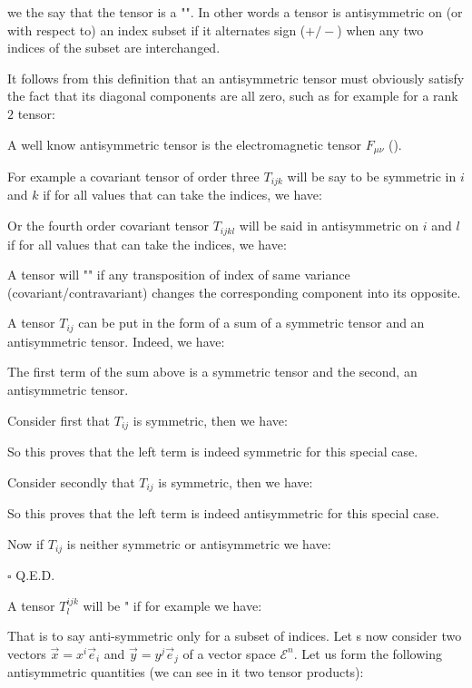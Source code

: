 	we the say that the tensor is a "".  In other words a tensor is antisymmetric on (or with respect to) an index subset if it alternates sign ($+/-$) when any two indices of the subset are interchanged.
	
	It follows from this definition that an antisymmetric tensor must obviously satisfy the fact that its diagonal components are all zero, such as for example for a rank $2$ tensor:
	
	
	A well know antisymmetric tensor is the electromagnetic tensor $F_{\mu \nu }$ ().
	
	For example a covariant tensor of order three $T_{ijk}$ will be say to be symmetric in $i$ and $k$ if for all values that can take the indices, we have:
	
	Or the fourth order covariant tensor $T_{ijkl}$ will be said in antisymmetric on $i$ and $l$ if for all values that can take the indices, we have:
	 
	
	A tensor will "" if any transposition of index of same variance (covariant/contravariant) changes the corresponding component into its opposite.

	A tensor $T_{ij}$ can be put in the form of a sum of a symmetric tensor and an antisymmetric tensor. Indeed, we have:
	
	The first term of the sum above is a symmetric tensor and the second, an antisymmetric tensor.
	\begin{dem}
	Consider first that $T_{ij}$ is symmetric, then we have:
	
	So this proves that the left term is indeed symmetric for this special case.
	
	Consider secondly that $T_{ij}$ is symmetric, then we have:
	
	So this proves that the left term is indeed antisymmetric for this special case.

	Now if $T_{ij}$ is neither symmetric or antisymmetric we have:
	
	\begin{flushright}
		$\square$  Q.E.D.
	\end{flushright}
	\end{dem}
	A tensor $T_l^{ijk}$ will be " if for example we have:
	
	That is to say anti-symmetric only for a subset of indices.
	Let s now consider two vectors $\vec{x}=x^i\vec{e}_i$ and $\vec{y}=y^j\vec{e}_j$ of a vector space $\mathcal{E}^n$. Let us form the following antisymmetric quantities (we can see in it two tensor products):
	
